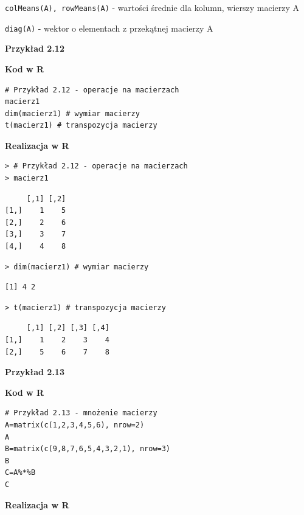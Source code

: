 \documentclass[12pt,B5paper,]{book}
\begin{document}
\texttt{colMeans(A), rowMeans(A)} - wartości średnie dla kolumn, wierszy
macierzy A

\texttt{diag(A)} - wektor o elementach z przekątnej macierzy A

\vspace{0.8cm}

\textbf{Przykład 2.12}

\textbf{Kod w R}

\begin{verbatim}
# Przykład 2.12 - operacje na macierzach
macierz1
dim(macierz1) # wymiar macierzy
t(macierz1) # transpozycja macierzy
\end{verbatim}

\vspace{0.8cm} \textbf{Realizacja w R}

\begin{verbatim}
> # Przykład 2.12 - operacje na macierzach
> macierz1
\end{verbatim}

\begin{verbatim}
     [,1] [,2]
[1,]    1    5
[2,]    2    6
[3,]    3    7
[4,]    4    8
\end{verbatim}

\begin{verbatim}
> dim(macierz1) # wymiar macierzy
\end{verbatim}

\begin{verbatim}
[1] 4 2
\end{verbatim}

\begin{verbatim}
> t(macierz1) # transpozycja macierzy
\end{verbatim}

\begin{verbatim}
     [,1] [,2] [,3] [,4]
[1,]    1    2    3    4
[2,]    5    6    7    8
\end{verbatim}

\vspace{0.8cm} \textbf{Przykład 2.13}

\textbf{Kod w R}

\begin{verbatim}
# Przykład 2.13 - mnożenie macierzy
A=matrix(c(1,2,3,4,5,6), nrow=2)
A
B=matrix(c(9,8,7,6,5,4,3,2,1), nrow=3)
B
C=A%*%B 
C
\end{verbatim}

\vspace{0.8cm} \textbf{Realizacja w R}
\end{document}
